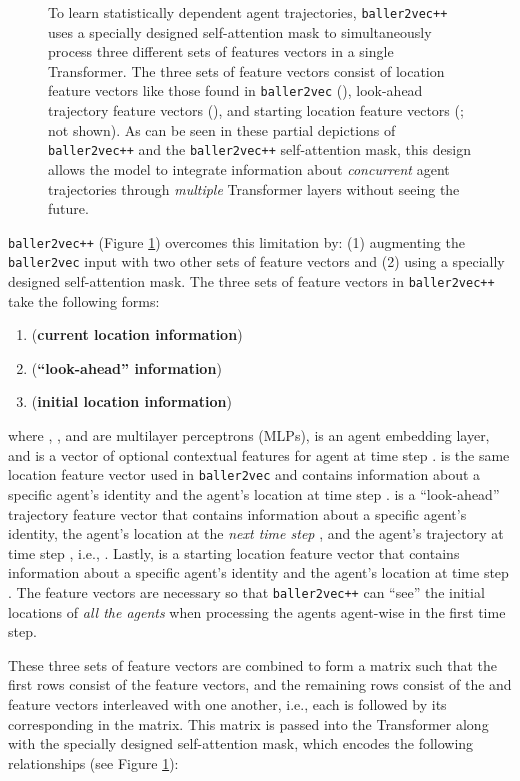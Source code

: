 \documentclass{article}
\newcommand{\btv}{\texttt{baller2vec}}
\newcommand{\btvpp}{\texttt{baller2vec++}}
\begin{document}
\begin{figure}[ht]
\centering
{}
\vskip -0.1in
\caption{To learn statistically dependent agent trajectories, \btvpp{} uses a specially designed self-attention mask to simultaneously process three different sets of features vectors in a single Transformer.
The three sets of feature vectors consist of location feature vectors like those found in \btv{} (), look-ahead trajectory feature vectors (), and starting location feature vectors (; not shown).
As can be seen in these partial depictions of \btvpp{} and the \btvpp{} self-attention mask, this design allows the model to integrate information about \textit{concurrent} agent trajectories through \textit{multiple} Transformer layers without seeing the future.
}
\label{fig:baller2vec++}
\end{figure}

\btvpp{} (Figure \ref{fig:baller2vec++}) overcomes this limitation by: (1) augmenting the \btv{} input with two other sets of feature vectors and (2) using a specially designed self-attention mask.
The three sets of feature vectors in \btvpp{} take the following forms:

\begin{enumerate}
    \item  \hfill (\textbf{current location information})
    \item  \hfill (\textbf{``look-ahead'' information})
    \item  \hfill (\textbf{initial location information})
\end{enumerate}

where , , and  are multilayer perceptrons (MLPs),  is an agent embedding layer, and  is a vector of optional contextual features for agent  at time step .
 is the same location feature vector used in \btv{} and contains information about a specific agent's identity and the agent's location at time step .
 is a ``look-ahead'' trajectory feature vector that contains information about a specific agent's identity, the agent's location at the \textit{next time step} , and the agent's trajectory at time step , i.e., .
Lastly,  is a starting location feature vector that contains information about a specific agent's identity and the agent's location at time step .
The  feature vectors are necessary so that \btvpp{} can ``see'' the initial locations of \textit{all the agents} when processing the agents agent-wise in the first time step.

These three sets of feature vectors are combined to form a  matrix  such that the first  rows consist of the   feature vectors, and the remaining  rows consist of the   and   feature vectors interleaved with one another, i.e., each  is followed by its corresponding  in the matrix.
This matrix is passed into the Transformer along with the specially designed self-attention mask, which encodes the following relationships (see Figure \ref{fig:baller2vec++}):
\end{document}
